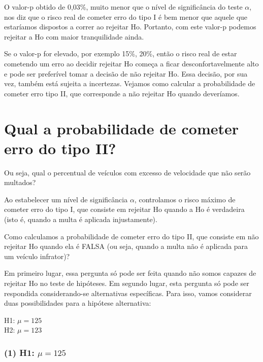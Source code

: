 \documentclass[
]{book}
\theoremstyle{definition}
\theoremstyle{definition}
\theoremstyle{definition}
\theoremstyle{remark}
\begin{document}
O valor-p obtido de 0,03\%, muito menor que o nível de significância do teste \(\alpha\), nos diz que o risco real de cometer erro do tipo I é bem menor que aquele que estaríamos dispostos a correr ao rejeitar Ho. Portanto, com este valor-p podemos rejeitar a Ho com maior tranquilidade ainda.

Se o valor-p for elevado, por exemplo 15\%, 20\%, então o risco real de estar cometendo um erro ao decidir rejeitar Ho começa a ficar desconfortavelmente alto e pode ser preferível tomar a decisão de não rejeitar Ho. Essa decisão, por sua vez, também está sujeita a incertezas. Vejamos como calcular a probabilidade de cometer erro tipo II, que corresponde a não rejeitar Ho quando deveríamos.

\hypertarget{qual-a-probabilidade-de-cometer-erro-do-tipo-ii}{%
\section*{Qual a probabilidade de cometer erro do tipo II?}\label{qual-a-probabilidade-de-cometer-erro-do-tipo-ii}}

Ou seja, qual o percentual de veículos com excesso de velocidade que não serão multados?

Ao estabelecer um nível de significância \(\alpha\), controlamos o risco máximo
de cometer erro do tipo I, que consiste em rejeitar Ho quando a Ho é verdadeira (isto é, quando a multa é aplicada injustamente).

Como calculamos a probabilidade de cometer erro do tipo II, que consiste em não rejeitar Ho quando ela é FALSA (ou seja, quando a multa não é aplicada para um veículo infrator)?

Em primeiro lugar, essa pergunta só pode ser feita quando não somos capazes de rejeitar Ho no teste de hipóteses. Em segundo lugar, esta pergunta só pode ser respondida considerando-se alternativas específicas. Para isso, vamos considerar duas possibilidades para a hipótese alternativa:

H1: \(\mu = 125\)\\
H2: \(\mu = 123\)

\hypertarget{h1-mu-125}{%
\subsubsection*{\texorpdfstring{(1) H1: \(\mu = 125\)}{(1) H1: \textbackslash mu = 125}}\label{h1-mu-125}}
\end{document}

